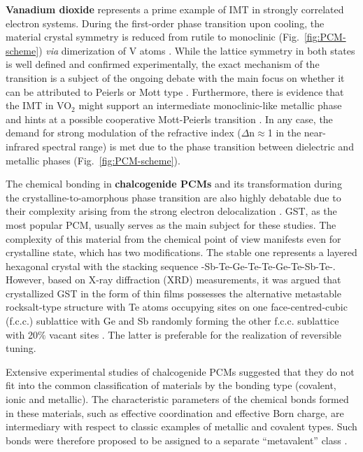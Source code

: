 \documentclass[journal=chreay,manuscript=review]{achemso}
\begin{document}
\textbf{Vanadium dioxide} represents a prime example of IMT in strongly correlated electron systems. During the first-order phase transition upon cooling, the material crystal symmetry is reduced from rutile to monoclinic (Fig.~\ref{fig:PCM-scheme}) \textit{via} dimerization of V atoms \cite{kubler2007coherent}. While the lattice symmetry in both states is well defined and confirmed experimentally, the exact mechanism of the transition is a subject of the ongoing debate with the main focus on whether it can be attributed to Peierls or Mott type \cite{liu2018recent}.  Furthermore, there is evidence that the IMT in VO$_2$ might support an intermediate monoclinic-like metallic phase and hints at a possible cooperative Mott-Peierls transition \cite{yao2010understanding,vidas2020does,grandi2020unraveling}. In any case, the demand for strong modulation of the refractive index ($\Delta$n$\approx$1 in the near-infrared spectral range) is met due to the phase transition between dielectric and metallic phases (Fig.~\ref{fig:PCM-scheme}). 

The chemical bonding in \textbf{chalcogenide PCMs} and its transformation during the crystalline-to-amorphous phase transition are also highly debatable due to their complexity arising from the strong electron delocalization \cite{kolobov2004understanding, lee2020chemical}. GST, as the most popular PCM, usually serves as the main subject for these studies. The complexity of this material from the chemical point of view manifests even for crystalline state, which has two modifications. The stable one represents a layered hexagonal crystal with the stacking sequence -Sb-Te-Ge-Te-Te-Ge-Te-Sb-Te-. However, based on X-ray diffraction (XRD) measurements, it was argued that crystallized GST in the form of thin films possesses the alternative metastable rocksalt-type structure with Te atoms occupying sites on one face-centred-cubic (f.c.c.) sublattice with Ge and Sb randomly forming the other f.c.c. sublattice with 20$\%$ vacant sites \cite{yamada2000structure}. The latter is preferable for the realization of reversible tuning. 

Extensive experimental studies of chalcogenide PCMs suggested that they do not fit into the common classification of materials by the bonding type (covalent, ionic and metallic). The characteristic parameters of the chemical bonds formed in these materials, such as effective coordination and effective Born charge, are intermediary with respect to classic examples of metallic and covalent types. Such bonds were therefore proposed to be assigned to a separate ``metavalent'' class \cite{zhu2018unique, wuttig2018incipient}.
\end{document}
